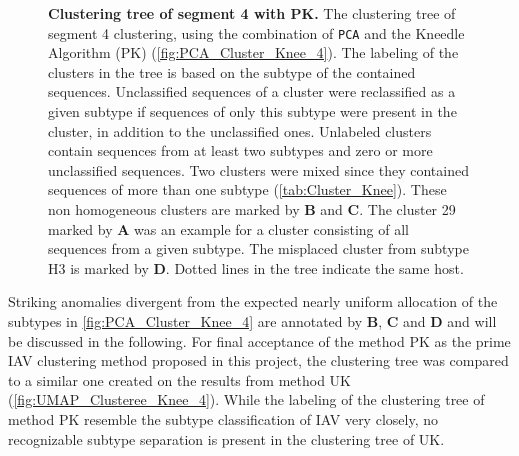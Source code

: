 \begin{figure}[!hbt]
    \caption[Clustering tree of segment 4 with PK]{\textbf{Clustering tree of segment 4 with PK.} The clustering tree of segment 4 clustering, using the combination of \texttt{PCA} and the Kneedle Algorithm (PK) (\autoref{fig:PCA_Cluster_Knee_4}). The labeling of the clusters in the tree is based on the subtype of the contained sequences. Unclassified sequences of a cluster were reclassified as a given subtype if sequences of only this subtype were present in the cluster, in addition to the unclassified ones. Unlabeled clusters contain sequences from at least two subtypes and zero or more unclassified sequences. Two clusters were mixed since they contained sequences of more than one subtype (\autoref{tab:Cluster_Knee}). These non homogeneous clusters are marked by \textbf{\textsf{B}} and \textbf{\textsf{C}}. The cluster 29 marked by \textbf{\textsf{A}} was an example for a cluster consisting of all sequences from a given subtype. The misplaced cluster from subtype H3 is marked by \textbf{\textsf{D}}. Dotted lines in the tree indicate the same host.}
    \label{fig:PCA_Clusteree_Knee_4}
\end{figure}

\vspace{1em}

Striking anomalies divergent from the expected nearly uniform allocation of the subtypes in \autoref{fig:PCA_Cluster_Knee_4} are annotated by \textbf{\textsf{B}}, \textbf{\textsf{C}} and \textbf{\textsf{D}} and will be discussed in the following. For final acceptance of the method PK as the prime \gls{IAV} clustering method proposed in this project, the clustering tree was compared to a similar one created on the results from method UK (\autoref{fig:UMAP_Clusteree_Knee_4}). While the labeling of the clustering tree of method PK resemble the subtype classification of \gls{IAV} very closely, no recognizable subtype separation is present in the clustering tree of UK. 